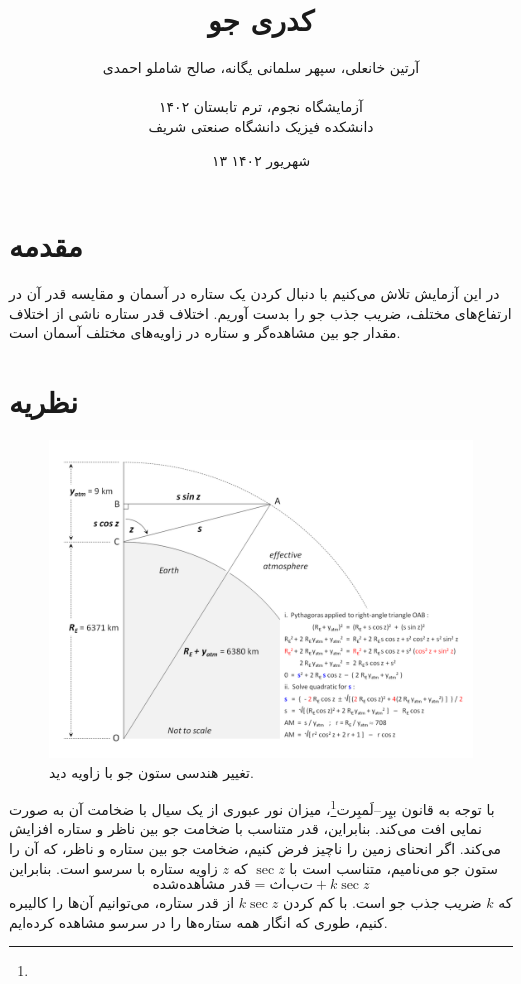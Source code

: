 \documentclass[12pt,a4paper]{article}
\title{کدری جو}
\author{آرتین خانعلی، سپهر سلمانی یگانه، صالح شاملو احمدی\\\\
	آزمایشگاه نجوم، ترم تابستان ۱۴۰۲\\دانشکده فیزیک دانشگاه صنعتی شریف}
\date{۱۳ شهریور ۱۴۰۲}
\begin{document}
	\maketitle
	\section{مقدمه}
	در این آزمایش تلاش می‌کنیم با دنبال کردن یک ستاره در آسمان و مقایسه قدر آن در ارتفاع‌های مختلف، ضریب جذب جو
	را بدست آوریم. اختلاف قدر ستاره ناشی از اختلاف مقدار جو بین مشاهده‌گر و ستاره در زاویه‌های مختلف آسمان است.
	\section{نظریه}
	\begin{figure}
		\centering
		\includegraphics[width=0.6\linewidth]{../fig/Airmass_geometry.png}
		\caption{تغییر هندسی ستون جو با زاویه دید.}
	\end{figure}
	با توجه به قانون بیِر--لَمبِرت\footnote{}، میزان نور عبوری از یک سیال با ضخامت آن به صورت
	نمایی افت می‌کند. بنابراین، قدر متناسب با ضخامت جو بین ناظر و ستاره افزایش می‌کند. اگر انحنای زمین را ناچیز
	فرض کنیم، ضخامت جو بین ستاره و ناظر، که آن را ستون جو می‌نامیم، متناسب است با $\sec z$ که $z$ زاویه ستاره
	با سرسو است. بنابراین
	\begin{equation}
		\text{قدر مشاهده‌شده} = ثابت + k\sec{z}
	\end{equation}
	که $k$ ضریب جذب جو است. با کم کردن $k\sec{z}$ از قدر ستاره، می‌توانیم آن‌ها را کالیبره کنیم، طوری که انگار
	همه ستاره‌ها را در سرسو مشاهده کرده‌ایم.
\end{document}
